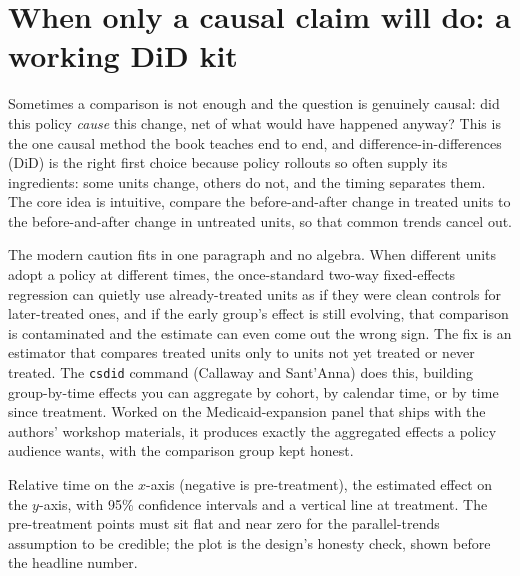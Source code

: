 \documentclass[
    a4paper,
    fontsize=10pt,
    twoside=true,
    numbers=noenddot,
]{kaobook}
\newenvironment{vizcallout}[1][Visualization to build]{%
    \begin{vizbox}[frametitle={#1}]%
}{%
    \end{vizbox}%
}
\begin{document}
\section{When only a causal claim will do: a working DiD kit}\label{sec:did}
Sometimes a comparison is not enough and the question is genuinely causal: did this policy \emph{cause} this change, net of what would have happened anyway? This is the one causal method the book teaches end to end, and difference-in-differences (DiD) is the right first choice because policy rollouts so often supply its ingredients: some units change, others do not, and the timing separates them. The core idea is intuitive, compare the before-and-after change in treated units to the before-and-after change in untreated units, so that common trends cancel out.

The modern caution fits in one paragraph and no algebra. When different units adopt a policy at different times, the once-standard two-way fixed-effects regression can quietly use already-treated units as if they were clean controls for later-treated ones, and if the early group's effect is still evolving, that comparison is contaminated and the estimate can even come out the wrong sign. The fix is an estimator that compares treated units only to units not yet treated or never treated. The \texttt{csdid} command (Callaway and Sant'Anna) does this, building group-by-time effects you can aggregate by cohort, by calendar time, or by time since treatment. Worked on the Medicaid-expansion panel that ships with the authors' workshop materials, it produces exactly the aggregated effects a policy audience wants, with the comparison group kept honest.

\begin{vizcallout}[Visualization to build: the event-study plot]
Relative time on the $x$-axis (negative is pre-treatment), the estimated effect on the $y$-axis, with 95\% confidence intervals and a vertical line at treatment. The pre-treatment points must sit flat and near zero for the parallel-trends assumption to be credible; the plot is the design's honesty check, shown before the headline number.
\end{vizcallout}
\end{document}
